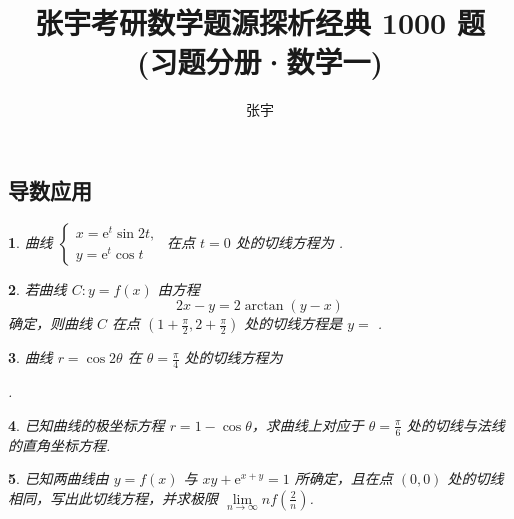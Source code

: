 \documentclass[openany,twocolumn]{ctexbook}
\title{张宇考研数学题源探析经典 1000 题\\(习题分册·数学一)}
\author{张宇}
\theoremstyle{change}
\newtheorem{ti}{}[section]
\newcommand{\hone}[1]{ \uline{\hspace{#1 pc}}}
\def\ee{\mathrm{e}}
\def\uppi{\pi}
\edef\lim{\lim\limits}
\begin{document}
	
	\subsection{导数应用}

	\begin{ti}
		曲线 $\begin{cases}
			x = \ee^{t} \sin 2t,\\
			y = \ee^{t} \cos t
		\end{cases}$ 在点 $t = 0$ 处的切线方程为\hone{6}.
	\end{ti}

	\begin{ti}
		若曲线 $C: y = f(x)$ 由方程
		\[
			2x - y = 2\arctan(y - x)
		\]
		确定，则曲线 $C$ 在点 $\left( 1 + \frac{\uppi}{2}, 2 + \frac{\uppi}{2} \right)$ 处的切线方程是 $y = $\hone{6}.
	\end{ti}

	\begin{ti}
		曲线 $r = \cos 2 \theta$ 在 $\theta = \frac{\uppi}{4}$ 处的切线方程为
		
		\noindent\hone{6}.
	\end{ti}

	\begin{ti}
		已知曲线的极坐标方程 $r = 1 - \cos \theta$，求曲线上对应于 $\theta = \frac{\uppi}{6}$ 处的切线与法线的直角坐标方程.
	\end{ti}

	\begin{ti}
		已知两曲线由 $y = f(x)$ 与 $xy + \ee^{x + y} = 1$ 所确定，且在点 $(0,0)$ 处的切线相同，写出此切线方程，并求极限 $\lim_{n \to \infty} n f\left( \frac{2}{n} \right)$.
	\end{ti}
\end{document}
